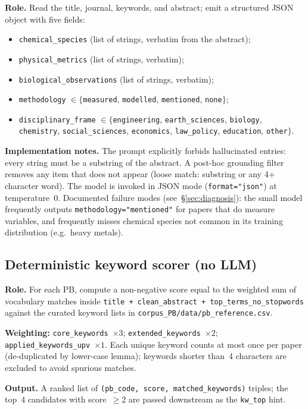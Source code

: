 \documentclass[11pt,a4paper]{article}
\begin{document}
\textbf{Role.} Read the title, journal, keywords, and abstract; emit a structured JSON object with five fields:
\begin{itemize}\itemsep0pt
\item \texttt{chemical\_species} (list of strings, verbatim from the abstract);
\item \texttt{physical\_metrics} (list of strings, verbatim);
\item \texttt{biological\_observations} (list of strings, verbatim);
\item \texttt{methodology} $\in\{$\texttt{measured}, \texttt{modelled}, \texttt{mentioned}, \texttt{none}$\}$;
\item \texttt{disciplinary\_frame} $\in\{$\texttt{engineering}, \texttt{earth\_sciences}, \texttt{biology}, \texttt{chemistry}, \texttt{social\_sciences}, \texttt{economics}, \texttt{law\_policy}, \texttt{education}, \texttt{other}$\}$.
\end{itemize}

\textbf{Implementation notes.}
The prompt explicitly forbids hallucinated entries: every string must be a substring of the abstract. A post-hoc grounding filter removes any item that does not appear (loose match: substring or any 4+ character word). The model is invoked in JSON mode (\texttt{format="json"}) at temperature~0. Documented failure modes (see~\S\ref{sec:diagnosis}): the small model frequently outputs \texttt{methodology="mentioned"} for papers that do measure variables, and frequently misses chemical species not common in its training distribution (e.g.\ heavy metals).

\subsection{Deterministic keyword scorer (no LLM)}

\textbf{Role.} For each PB, compute a non-negative score equal to the weighted sum of vocabulary matches inside \texttt{title + clean\_abstract + top\_terms\_no\_stopwords} against the curated keyword lists in \texttt{corpus\_PB/data/pb\_reference.csv}.

\textbf{Weighting:}
\texttt{core\_keywords}~$\times 3$;
\texttt{extended\_keywords}~$\times 2$;
\texttt{applied\_keywords\_upv}~$\times 1$.
Each unique keyword counts at most once per paper (de-duplicated by lower-case lemma); keywords shorter than~4 characters are excluded to avoid spurious matches.

\textbf{Output.} A ranked list of \texttt{(pb\_code, score, matched\_keywords)} triples; the top~4 candidates with score~$\geq 2$ are passed downstream as the \texttt{kw\_top} hint.
\end{document}
